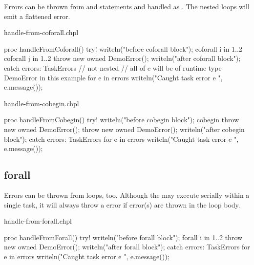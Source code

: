 Errors can be thrown from  and 
statements and handled as . The nested 
loops will emit a flattened  error.

\begin{chapelexample}{handle-from-coforall.chpl}
\begin{chapel}
proc handleFromCoforall() {
  try! {
    writeln("before coforall block");
    coforall i in 1..2 {
      coforall j in 1..2 {
        throw new owned DemoError();
      }
    }
    writeln("after coforall block");
  } catch errors: TaskErrors { // not nested
    // all of e will be of runtime type DemoError in this example
    for e in errors {
      writeln("Caught task error e ", e.message());
    }
  }
}
\end{chapel}
\end{chapelexample}

\begin{chapelexample}{handle-from-cobegin.chpl}
\begin{chapel}
proc handleFromCobegin() {
  try! {
    writeln("before cobegin block");
    cobegin {
      throw new owned DemoError();
      throw new owned DemoError();
    }
    writeln("after cobegin block");
  } catch errors: TaskErrors {
    for e in errors {
      writeln("Caught task error e ", e.message());
    }
  }
}
\end{chapel}
\end{chapelexample}

\subsection{forall}
\label{Errors_forall}

Errors can be thrown from  loops, too.
Although the  may execute serially within
a single task, it will always throw a  error
if error(s) are thrown in the loop body.

\begin{chapelexample}{handle-from-forall.chpl}
\begin{chapel}
proc handleFromForall() {
  try! {
    writeln("before forall block");
    forall i in 1..2 {
      throw new owned DemoError();
    }
    writeln("after forall block");
  } catch errors: TaskErrors {
    for e in errors {
      writeln("Caught task error e ", e.message());
    }
  }
}
\end{chapel}
\end{chapelexample}


